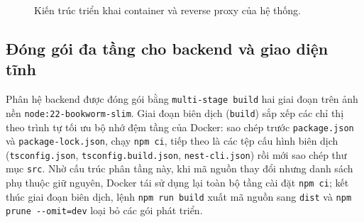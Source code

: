 \begin{figure}[htbp]
{%
    }
    \caption{Kiến trúc triển khai container và reverse proxy của hệ thống.}
    \label{fig:kien-truc-trien-khai}
\end{figure}

\subsection{Đóng gói đa tầng cho backend và giao diện tĩnh}
\label{subsec:dong-goi-dockerfile}

Phân hệ backend được đóng gói bằng \texttt{multi-\allowbreak{}stage build} hai giai đoạn trên ảnh nền \texttt{node:\allowbreak{}22-\allowbreak{}bookworm-\allowbreak{}slim}. Giai đoạn biên dịch (\texttt{build}) sắp xếp các chỉ thị theo trình tự tối ưu bộ nhớ đệm tầng của Docker: sao chép trước \texttt{package.\allowbreak{}json} và \texttt{package-\allowbreak{}lock.\allowbreak{}json}, chạy \texttt{npm ci}, tiếp theo là các tệp cấu hình biên dịch (\texttt{tsconfig.\allowbreak{}json}, \texttt{tsconfig.\allowbreak{}build.\allowbreak{}json}, \texttt{nest-\allowbreak{}cli.\allowbreak{}json}) rồi mới sao chép thư mục \texttt{src}. Nhờ cấu trúc phân tầng này, khi mã nguồn thay đổi nhưng danh sách phụ thuộc giữ nguyên, Docker tái sử dụng lại toàn bộ tầng cài đặt \texttt{npm ci}; kết thúc giai đoạn biên dịch, lệnh \texttt{npm run build} xuất mã nguồn sang \texttt{dist} và \texttt{npm prune -\allowbreak{}-\allowbreak{}omit=\allowbreak{}dev} loại bỏ các gói phát triển.

